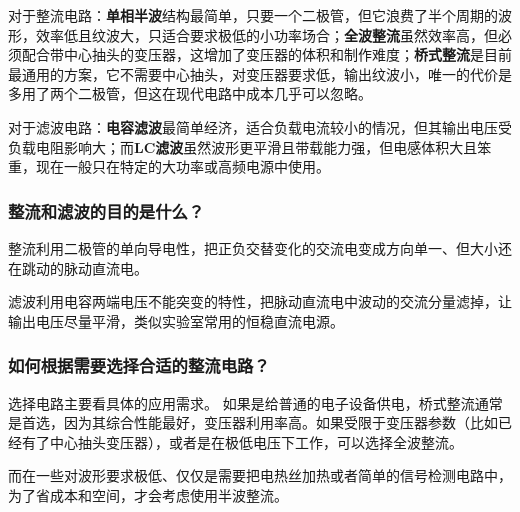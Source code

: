 \documentclass{../template/Report}%
\begin{document}
\begin{fullreportonly}
    对于整流电路：\textbf{单相半波}结构最简单，只要一个二极管，但它浪费了半个周期的波形，效率低且纹波大，只适合要求极低的小功率场合；\textbf{全波整流}虽然效率高，但必须配合带中心抽头的变压器，这增加了变压器的体积和制作难度；\textbf{桥式整流}是目前最通用的方案，它不需要中心抽头，对变压器要求低，输出纹波小，唯一的代价是多用了两个二极管，但这在现代电路中成本几乎可以忽略。

    对于滤波电路：\textbf{电容滤波}最简单经济，适合负载电流较小的情况，但其输出电压受负载电阻影响大；而\textbf{LC滤波}虽然波形更平滑且带载能力强，但电感体积大且笨重，现在一般只在特定的大功率或高频电源中使用。

    \subsubsection{整流和滤波的目的是什么？}

    整流利用二极管的单向导电性，把正负交替变化的交流电变成方向单一、但大小还在跳动的脉动直流电。

    滤波利用电容两端电压不能突变的特性，把脉动直流电中波动的交流分量滤掉，让输出电压尽量平滑，类似实验室常用的恒稳直流电源。

    \subsubsection{如何根据需要选择合适的整流电路？}

    选择电路主要看具体的应用需求。
    如果是给普通的电子设备供电，桥式整流通常是首选，因为其综合性能最好，变压器利用率高。如果受限于变压器参数（比如已经有了中心抽头变压器），或者是在极低电压下工作，可以选择全波整流。

    而在一些对波形要求极低、仅仅是需要把电热丝加热或者简单的信号检测电路中，为了省成本和空间，才会考虑使用半波整流。
\end{fullreportonly}
\insertnotes
\end{document}
